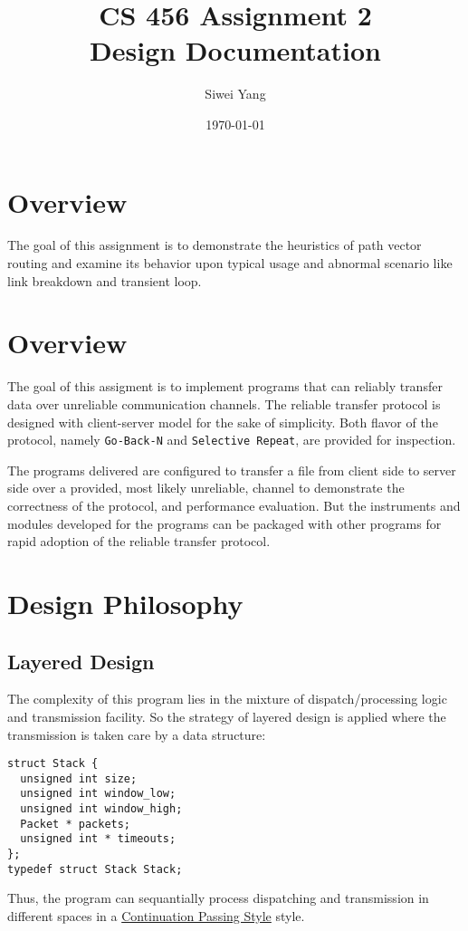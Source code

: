 \documentclass[12pt]{article}
\begin{document}
\title{CS 456 Assignment 2\\Design Documentation}
\date{\today}
\author{Siwei Yang}
\maketitle

\section{Overview}
The goal of this assignment is to demonstrate the heuristics of path vector routing and examine its behavior upon typical usage and abnormal scenario like link breakdown and transient loop.

\section{Overview}
The goal of this assigment is to implement programs that can reliably transfer data over unreliable communication channels. The reliable transfer protocol is designed with client-server model for the sake of simplicity. Both flavor of the protocol, namely \texttt{Go-Back-N} and \texttt{Selective Repeat}, are provided for inspection.

The programs delivered are configured to transfer a file from client side to server side over a provided, most likely unreliable, channel to demonstrate the correctness of the protocol, and performance evaluation. But the instruments and modules developed for the programs can be packaged with other programs for rapid adoption of the reliable transfer protocol.

\section{Design Philosophy}
\subsection{Layered Design}
The complexity of this program lies in the mixture of dispatch/processing logic and transmission facility. So the strategy of layered design is applied where the transmission is taken care by a data structure:
\begin{samepage}
\begin{verbatim}
struct Stack {
  unsigned int size;
  unsigned int window_low;
  unsigned int window_high;
  Packet * packets;
  unsigned int * timeouts;
};
typedef struct Stack Stack;
\end{verbatim}
\end{samepage}
Thus, the program can sequantially process dispatching and transmission in different spaces in a \href{http://en.wikipedia.org/wiki/Continuation-passing_style}{Continuation Passing Style} style.
\end{document}
